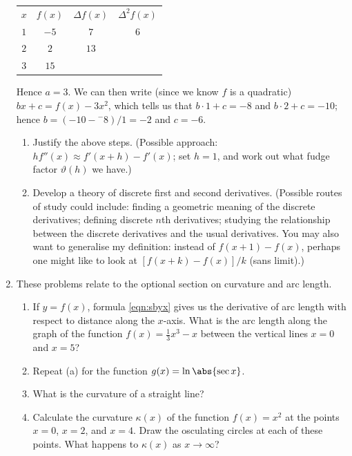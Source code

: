 \begin{enumerate}
        \begin{tabular}{c|c|c|c}
          $ x $ & $ f(x) $ & $ \Delta f(x) $ & $ \Delta^2 f(x) $\\
          $ 1 $ & $ -5 $ & $ 7 $ & $ 6 $\\
          $ 2 $ & $ 2 $ & $ 13 $ & \\
          $ 3 $ & $ 15 $ &&
        \end{tabular}

        Hence $ a = 3 $. We can then write (since we know $ f $ is a quadratic) $ bx + c = f(x) - 3x^2 $, which tells us that $ b\cdot 1 + c = -8 $
        and $ b \cdot 2 + c = -10 $; hence $ b = (-10 - {}^{-}8)/1 = -2 $ and $ c = -6 $. \label{exercise:funtimeswithcalculus}

        \begin{enumerate}
          \item Justify the above steps. (Possible approach: $ hf''(x) \approx f'(x + h) - f'(x) $; set $ h = 1 $, and work out what fudge
                factor $ \vartheta(h) $ we have.)
          \item Develop a theory of discrete first and second derivatives. (Possible routes of study could include: finding a geometric
                meaning of the discrete derivatives; defining discrete $ n$th derivatives; studying the relationship between the discrete
                derivatives and the usual derivatives. You may also want to generalise my definition: instead of $ f(x + 1) - f(x) $,
                perhaps one might like to look at $ [f(x + k) - f(x)]/k $ (sans limit).)
        \end{enumerate}
  \item These problems relate to the optional section on curvature and arc length.
    \begin{enumerate}
      \item If $ y = f(x) $, formula \ref{eqn:sbyx} gives us the derivative of arc length with respect to distance
            along the $ x$-axis. What is the arc length along the graph of the function $ f(x) = \frac{1}{3}x^3 - x $
            between the vertical lines $ x = 0 $ and $ x = 5 $?
      \item Repeat (a) for the function $ g(x) = \ln \abs{\sec x} $.
      \item What is the curvature of a straight line?
      \item Calculate the curvature $ \kappa(x) $ of the function $ f(x) = x^2 $ at the points $ x = 0 $, $ x = 2 $, and $ x = 4 $.
            Draw the osculating circles at each of these points. What happens to $ \kappa(x) $ as $ x \to \infty $?
    \end{enumerate}
\end{enumerate}

